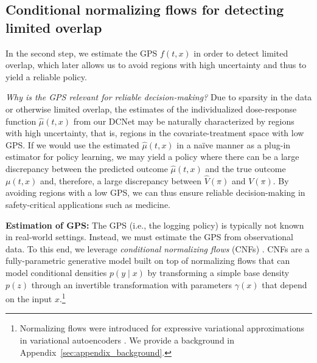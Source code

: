 \documentclass{article}
\theoremstyle{definition}
\theoremstyle{plain}
\begin{document}
\subsection{Conditional normalizing flows for detecting limited overlap} 
\label{sec:cnf}

In the second step, we estimate the GPS $f(t, x)$ in order to detect limited overlap, which later allows us to avoid regions with high uncertainty and thus to yield a reliable policy. 

\emph{Why is the GPS relevant for reliable decision-making?} Due to sparsity in the data or otherwise limited overlap, the estimates of the individualized dose-response function $\hat{\mu}(t, x)$ from our DCNet may be naturally characterized by regions with high uncertainty, that is, regions in the covariate-treatment space with low GPS. If we would use the estimated $\hat{\mu}(t, x)$ in a na{\"i}ve manner as a plug-in estimator for policy learning, we may yield a policy where there can be a large discrepancy between the predicted outcome $\hat{\mu}(t, x)$ and the true outcome $\mu(t, x)$ and, therefore, a large discrepancy between $\hat{V}(\pi)$ and $V(\pi)$. By avoiding regions with a low GPS, we can thus ensure reliable decision-making in safety-critical applications such as medicine.

\textbf{Estimation of GPS:} The GPS (i.e., the logging policy) is typically not known in real-world settings. Instead, we must estimate the GPS from observational data. To this end, we leverage \emph{conditional normalizing flows} (CNFs) \cite{trippe2018conditional,winkler2019learning}. CNFs are a fully-parametric generative model built on top of normalizing flows \cite{rezende2015variational, tabak2010density} that can model conditional densities $p(y \mid x)$ by transforming a simple base density $p(z)$ through an invertible transformation with parameters $\gamma(x)$ that depend on the input $x$.\footnote{Normalizing flows were introduced for expressive variational approximations in variational autoencoders \cite{rezende2015variational, tabak2010density}.  
We provide a background in Appendix~\ref{sec:appendix_background}.} 
\end{document}
